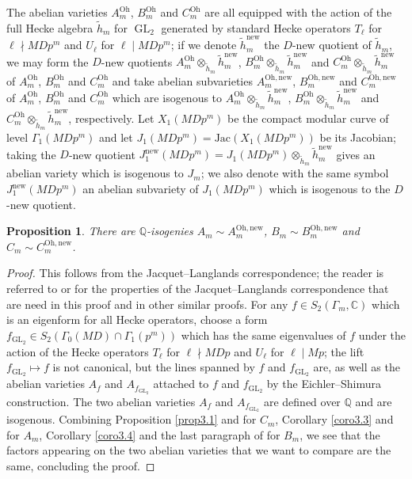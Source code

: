 \documentclass[a4paper,11pt]{amsart}
\numberwithin{equation}{section}
\theoremstyle{plain}
\newtheorem{proposition}[theorem]{Proposition}
\theoremstyle{definition}
\theoremstyle{remark}
\newcommand{\Q}{\mathbb{Q}}
\newcommand{\C}{\mathbb{C}}
\DeclareMathOperator{\GL}{GL}
\newcommand{\new}{\mathrm{new}}
\newcommand{\Oh}{\mathrm{Oh}}
\begin{document}
The abelian varieties $A_m^\Oh$, $B_m^\Oh$ and $C_m^\Oh$ are all equipped with the action of the full Hecke algebra $\tilde h_m$ for $\GL_2$ generated by standard Hecke operators $T_\ell$ for $\ell\nmid MDp^m$ and $U_\ell$ for $\ell\mid MDp^m$;  
if we denote $\tilde h_m^\new$ the $D$-new quotient of $\tilde h_m$, we may form the $D$-new quotients $ A_m^\Oh\otimes_{\tilde h_m}\tilde h_m^\new$,  
$B_m^\Oh\otimes_{\tilde h_m}\tilde h_m^\new$
and 
$C_m^\Oh\otimes_{\tilde h_m}\tilde h_m^\new$ of $A_m^\Oh$, $B_m^\Oh$ and $C_m^\Oh$ and take abelian subvarieties $A_m^{\Oh,\new}$, $B_m^{\Oh,\new}$ and $C_m^{\Oh,\new}$ of $A_m^\Oh$, $B_m^\Oh$ 
and $C_m^\Oh$ which are isogenous to $ A_m^\Oh\otimes_{\tilde h_m}\tilde h_m^\new$, $B_m^\Oh\otimes_{\tilde h_m}\tilde h_m^\new$  and 
$C_m^\Oh\otimes_{\tilde h_m}\tilde h_m^\new$, respectively. 
Let $X_1(MDp^m)$ be the compact modular curve of 
    level $\Gamma_1(MDp^m)$ and let $J_1(MDp^m)=\mathrm{Jac}(X_1(MDp^m))$ be its Jacobian; 
    taking the $D$-new quotient $J_1^\new(MDp^m)=J_1(MDp^m)\otimes_{\tilde h_m} \tilde{h}_m^\new$ 
     gives an abelian
    variety which is isogenous to $J_m$; we also denote with the same symbol $J_1^\new(MDp^m)$ an abelian subvariety of $J_1(MDp^m)$ which is isogenous to the $D$-new quotient.  

\begin{proposition}\label{isogenyprop} 
    There are $\Q$-isogenies $A_m\sim A_m^{\Oh,\new}$, $B_m\sim B_m^{\Oh,\new}$ and $C_m\sim C_m^{\Oh,\new}$.
\end{proposition}
\begin{proof} This follows from the Jacquet--Langlands correspondence; the reader is referred 
to \cite[\S1.6]{BD} or \cite[\S2.2]{LRdVP} for the properties of the Jacquet--Langlands correspondence that are need in this proof and in other similar proofs.
For any $f\in S_2(\Gamma_m,\C)$ which is an eigenform for all Hecke operators, choose a form $f_{\GL_2}\in S_2(\Gamma_0(MD)\cap\Gamma_1(p^m))$ 
which has the same eigenvalues of $f$ under the action of the Hecke operators $T_\ell$ for $\ell\nmid MDp$ and $U_\ell$ for $\ell\mid Mp$; the lift $f_\mathrm{GL_2}\mapsto f$ is not canonical, but the lines spanned by $f$ and $f_\mathrm{GL_2}$ are, as well as the abelian varieties $A_f$ and $A_{f_\mathrm{GL_2}}$ attached to $f$ and $f_\mathrm{GL_2}$ by the Eichler--Shimura construction. The two abelian varieties $A_f$ and $A_{f_\mathrm{GL_2}}$ are defined over $\Q$ and are isogenous. Combining Proposition \ref{prop3.1} and \cite[Proposition (4.1.8)]{OhtaC} for $C_m$, 
Corollary \ref{coro3.3} and \cite[Proposition (1.1.5)]{OhtaMA} for $A_m$, Corollary \ref{coro3.4} and the last paragraph of \cite[\S1.1]{OhtaMA} for $B_m$, 
we see that the factors appearing on the two abelian varieties that we want to compare are the same, concluding the proof. 
\end{proof} 
\end{document}

